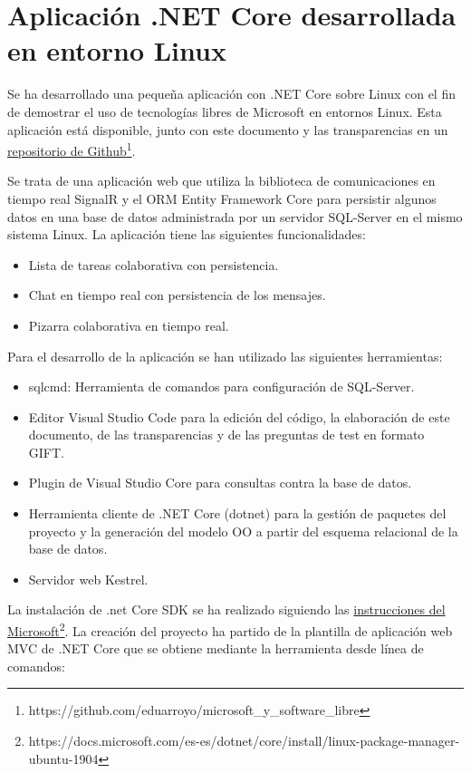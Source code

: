 \section{Aplicación .NET Core desarrollada en entorno Linux}
Se ha desarrollado una pequeña aplicación con .NET Core sobre Linux con el fin de demostrar el uso de tecnologías libres de Microsoft en entornos Linux. Esta aplicación está disponible, junto con este documento y las transparencias en un \href{https://github.com/eduarroyo/microsoft_y_software_libre}{repositorio de Github}\footnote{https://github.com/eduarroyo/microsoft\_y\_software\_libre}.

Se trata de una aplicación web que utiliza la biblioteca de comunicaciones en tiempo real SignalR y el ORM Entity Framework Core para persistir algunos datos en una base de datos administrada por un servidor SQL-Server en el mismo sistema Linux. La aplicación tiene las siguientes funcionalidades:

\begin{itemize}
    \item Lista de tareas colaborativa con persistencia.
    \item Chat en tiempo real con persistencia de los mensajes.
    \item Pizarra colaborativa en tiempo real.
\end{itemize}

Para el desarrollo de la aplicación se han utilizado las siguientes herramientas:
\begin{itemize}
    \item sqlcmd: Herramienta de comandos para configuración de SQL-Server.
    \item Editor Visual Studio Code para la edición del código, la elaboración de este documento, de las transparencias y de las preguntas de test en formato GIFT.
    \item Plugin de Visual Studio Core para consultas contra la base de datos.
    \item Herramienta cliente de .NET Core (dotnet) para la gestión de paquetes del proyecto y la generación del modelo OO a partir del esquema relacional de la base de datos.
    \item Servidor web Kestrel.
\end{itemize}

La instalación de .net Core SDK se ha realizado siguiendo las \href{https://docs.microsoft.com/es-es/dotnet/core/install/linux-package-manager-ubuntu-1904}{instrucciones del Microsoft}\footnote{https://docs.microsoft.com/es-es/dotnet/core/install/linux-package-manager-ubuntu-1904}. La creación del proyecto ha partido de la plantilla de aplicación web MVC de .NET Core que se obtiene mediante la herramienta  desde línea de comandos:

